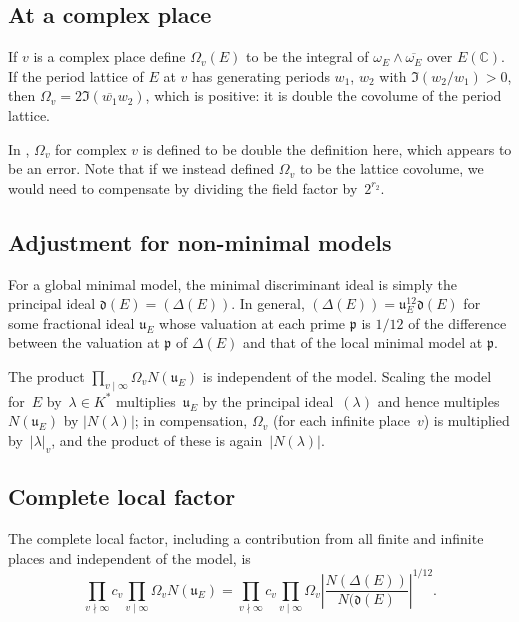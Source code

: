 \documentclass{amsart}
\newcommand\C{\mathbb{C}}
\begin{document}
\subsection{At a complex place}\label{at-a-complex-place}

If \(v\) is a complex place define \(\Omega_v(E)\) to be the integral
of \(\omega_E\wedge\overline{\omega_E}\) over \(E(\C)\). If the period
lattice of \(E\) at \(v\) has generating periods \(w_1\), \(w_2\) with
\(\Im(w_2/w_1)>0\), then \(\Omega_v=2\Im(\overline{w_1}w_2)\), which
is positive: it is double the covolume of the period lattice.

In \cite{Dok}, \(\Omega_v\) for complex \(v\) is defined to be double
the definition here, which appears to be an error.  Note that if we
instead defined $\Omega_v$ to be the lattice covolume, we would need
to compensate by dividing the field factor by~$2^{r_2}$.

\subsection{Adjustment for non-minimal models}\label{adjustment-for-non-minimal-models}

For a global minimal model, the minimal discriminant ideal is simply the
principal ideal \(\mathfrak{d}(E)=(\Delta(E))\). In general,
\((\Delta(E))=\mathfrak{u}_E^{12}\mathfrak{d}(E)\) for some fractional
ideal \(\mathfrak{u}_E\) whose valuation at each prime \(\mathfrak{p}\) is
\(1/12\) of the difference between the valuation at \(\mathfrak{p}\) of
\(\Delta(E)\) and that of the local minimal model at \(\mathfrak{p}\).

The product \(\prod_{v\mid\infty}\Omega_v N(\mathfrak{u}_E)\) is
independent of the model.  Scaling the model for~$E$ by~$\lambda\in
K^*$ multiplies~$\mathfrak{u}_E$ by the principal ideal~$(\lambda)$
and hence multiples~\(N(\mathfrak{u}_E)\) by \(|N(\lambda)|\); in
compensation, \(\Omega_v\) (for each infinite place~$v$) is
multiplied by~$|\lambda|_v$, and the product of these is
again~\(|N(\lambda)|\).

\subsection{Complete local factor}\label{complete-local-factor}
The complete local factor, including a contribution from all finite
and infinite places and independent of the model,  is
\[
\prod_{v\nmid\infty}c_v\prod_{v\mid\infty}\Omega_v N(\mathfrak{u}_E)
=
\prod_{v\nmid\infty}c_v\prod_{v\mid\infty}\Omega_v \left|\frac{N(\Delta(E))}{N(\mathfrak{d}(E)}\right|^{1/12}.
\]
\end{document}
